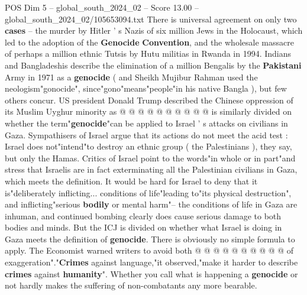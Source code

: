\begin{textsample}{POS Dim 5 – global\_south\_2024\_02 – Score 13.00 – global\_south\_2024\_02/105653094.txt}
There is universal agreement on only two \textbf{cases} -- the murder by Hitler ' s Nazis of six million Jews in the Holocaust, which led to the adoption of the \textbf{Genocide} \textbf{Convention}, and the wholesale massacre of perhaps a million ethnic Tutsis by Hutu militias in Rwanda in 1994.
Indians and Bangladeshis describe the elimination of a million Bengalis by the \textbf{Pakistani} Army in 1971 as a \textbf{genocide} ( and Sheikh Mujibur Rahman used the neologism"gonocide", since"gono"means"people"in his native Bangla ), but few others concur.
US president Donald Trump described the Chinese oppression of its Muslim Uyghur minority as @ @ @ @ @ @ @ @ @ @ is similarly divided on whether the term"\textbf{genocide}"can be applied to Israel ' s attacks on civilians in Gaza.
Sympathisers of Israel argue that its actions do not meet the acid test : Israel does not"intend"to destroy an ethnic group ( the Palestinians ), they say, but only the Hamas.
Critics of Israel point to the words"in whole or in part"and stress that Israelis are in fact exterminating all the Palestinian civilians in Gaza, which meets the definition.
It would be hard for Israel to deny that it is"deliberately inflicting... conditions of life"leading to"its physical destruction", and inflicting"serious \textbf{bodily} or mental harm"-- the conditions of life in Gaza are inhuman, and continued bombing clearly does cause serious damage to both bodies and minds.
But the ICJ is divided on whether what Israel is doing in Gaza meets the definition of \textbf{genocide}.
There is obviously no simple formula to apply.
The Economist warned writers to avoid both @ @ @ @ @ @ @ @ @ @ of exaggeration"."\textbf{Crimes} against language,"it observed,"make it harder to describe \textbf{crimes} against \textbf{humanity}".
Whether you call what is happening a \textbf{genocide} or not hardly makes the suffering of non-combatants any more bearable.

\end{textsample}
